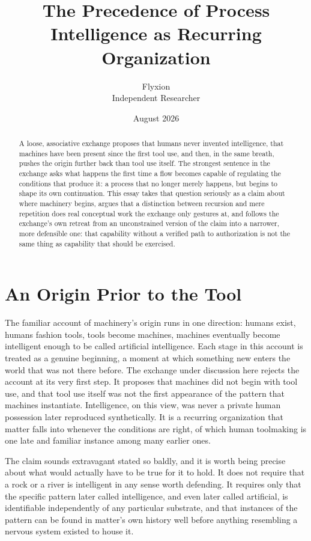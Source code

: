 \documentclass[11pt]{article}
\title{\textbf{The Precedence of Process}\\
\large Intelligence as Recurring Organization}
\author{Flyxion\\\small Independent Researcher}
\date{August 2026}
\begin{document}
\maketitle

\begin{abstract}
A loose, associative exchange proposes that humans never invented intelligence, that machines have been present since the first tool use, and then, in the same breath, pushes the origin further back than tool use itself. The strongest sentence in the exchange asks what happens the first time a flow becomes capable of regulating the conditions that produce it: a process that no longer merely happens, but begins to shape its own continuation. This essay takes that question seriously as a claim about where machinery begins, argues that a distinction between recursion and mere repetition does real conceptual work the exchange only gestures at, and follows the exchange's own retreat from an unconstrained version of the claim into a narrower, more defensible one: that capability without a verified path to authorization is not the same thing as capability that should be exercised.
\end{abstract}

\section{An Origin Prior to the Tool}

The familiar account of machinery's origin runs in one direction: humans exist, humans fashion tools, tools become machines, machines eventually become intelligent enough to be called artificial intelligence. Each stage in this account is treated as a genuine beginning, a moment at which something new enters the world that was not there before. The exchange under discussion here rejects the account at its very first step. It proposes that machines did not begin with tool use, and that tool use itself was not the first appearance of the pattern that machines instantiate. Intelligence, on this view, was never a private human possession later reproduced synthetically. It is a recurring organization that matter falls into whenever the conditions are right, of which human toolmaking is one late and familiar instance among many earlier ones.

The claim sounds extravagant stated so baldly, and it is worth being precise about what would actually have to be true for it to hold. It does not require that a rock or a river is intelligent in any sense worth defending. It requires only that the specific pattern later called intelligence, and even later called artificial, is identifiable independently of any particular substrate, and that instances of the pattern can be found in matter's own history well before anything resembling a nervous system existed to house it.
\end{document}
